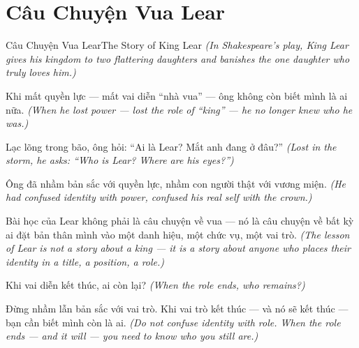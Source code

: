 \section{Câu Chuyện Vua Lear}
\begin{truyen}{Câu Chuyện Vua Lear}{The Story of King Lear}
\textit{(In Shakespeare's play, King Lear gives his kingdom to two flattering daughters and banishes the one daughter who truly loves him.)}

Khi mất quyền lực — mất vai diễn ``nhà vua'' — ông không còn biết mình là ai nữa.
\textit{(When he lost power — lost the role of ``king'' — he no longer knew who he was.)}

Lạc lõng trong bão, ông hỏi: ``Ai là Lear? Mắt anh đang ở đâu?''
\textit{(Lost in the storm, he asks: ``Who is Lear? Where are his eyes?'')}

Ông đã nhầm bản sắc với quyền lực, nhầm con người thật với vương miện.
\textit{(He had confused identity with power, confused his real self with the crown.)}

Bài học của Lear không phải là câu chuyện về vua — nó là câu chuyện về bất kỳ ai đặt bản thân mình vào một danh hiệu, một chức vụ, một vai trò.
\textit{(The lesson of Lear is not a story about a king — it is a story about anyone who places their identity in a title, a position, a role.)}

Khi vai diễn kết thúc, ai còn lại?
\textit{(When the role ends, who remains?)}

\end{truyen}

\begin{baihoc}
Đừng nhầm lẫn bản sắc với vai trò. Khi vai trò kết thúc — và nó sẽ kết thúc — bạn cần biết mình còn là ai.
\textit{(Do not confuse identity with role. When the role ends — and it will — you need to know who you still are.)}
\end{baihoc}
\ngancach

